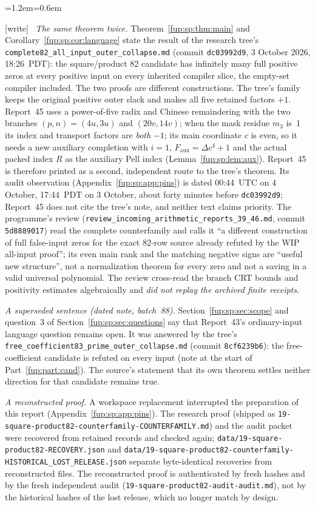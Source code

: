\documentclass[11pt,letterpaper]{article}
\theoremstyle{definition}\newtheorem{definition}[theorem]{Definition}
\theoremstyle{remark}\newtheorem{remark}[theorem]{Remark}
\newcommand{\Fa}{F_{\mathrm{aux}}}\newcommand{\Ua}{U_{\mathrm{aux}}}\newcommand{\ttt}{t_{\mathrm{tr}}}
\newcommand{\wtag}{\textup{[write]}}
\newenvironment{writenote}{\par\smallskip\begin{list}{}{\leftmargin=1.2em\rightmargin=0.6em}\item[]\small\wtag\ }{\end{list}\smallskip}
\newcommand{\rw}[1]{\nolinkurl{#1}}%
\begin{document}
\begin{writenote}
\emph{The same theorem twice.} Theorem~\ref{fup:sp:thm:main} and Corollary~\ref{fup:sp:cor:language} state the result of the research tree's \rw{complete82_all_input_outer_collapse.md} (commit \texttt{dc03992d9}, 3 October 2026, 18:26~PDT): the square/product 82 candidate has infinitely many full positive zeros at every positive input on every inherited compiler slice, the empty-set compiler included. The two proofs are different constructions. The tree's family keeps the original positive outer slack and makes all five retained factors $+1$. Report~45 uses a power-of-five radix and Chinese remaindering with the two branches $(p,n)=(4u,3u)$ and $(20v,14v)$; when the mask residue $m_3$ is~1 its index and transport factors are \emph{both} $-1$; its main coordinate $c$ is even, so it needs a new auxiliary completion with $i=1$, $\Fa=\Delta c^4+1$ and the actual packed index $R$ as the auxiliary Pell index (Lemma~\ref{fup:sp:lem:aux}). Report~45 is therefore printed as a second, independent route to the tree's theorem. Its audit observation (Appendix~\ref{fup:sp:app:pins}) is dated 00:44~UTC on 4 October, 17:44~PDT on 3 October, about forty minutes before \texttt{dc03992d9}; Report~45 does not cite the tree's note, and neither text claims priority. The programme's review (\rw{review_incoming_arithmetic_reports_39_46.md}, commit \texttt{5d8889017}) read the complete counterfamily and calls it ``a different construction of full false-input zeros for the exact 82-row source already refuted by the WIP all-input proof''; its even main rank and the matching negative signs are ``useful new structure'', not a normalization theorem for every zero and not a saving in a valid universal polynomial. The review cross-read the branch CRT bounds and positivity estimates algebraically and \emph{did not replay the archived finite receipts}.

\emph{A superseded sentence (dated note, batch~88).} Section~\ref{fup:sp:sec:scope} and question~3 of Section~\ref{fup:sp:sec:questions} say that Report~43's ordinary-input language question remains open. It was answered by the tree's \rw{free_coefficient83_prime_outer_collapse.md} (commit \texttt{8cf6239b6}): the free-coefficient candidate is refuted on every input (note at the start of Part~\ref{fup:part:cand}). The source's statement that its own theorem settles neither direction for that candidate remains true.

\emph{A reconstructed proof.} A workspace replacement interrupted the preparation of this report (Appendix~\ref{fup:sp:app:pins}). The research proof (shipped as \rw{19-square-product82-counterfamily-COUNTERFAMILY.md}) and the audit packet were recovered from retained records and checked again; \rw{data/19-square-product82-RECOVERY.json} and \rw{data/19-square-product82-counterfamily-HISTORICAL_LOST_RELEASE.json} separate byte-identical recoveries from reconstructed files. The reconstructed proof is authenticated by fresh hashes and by the fresh independent audit (\rw{19-square-product82-audit-audit.md}), not by the historical hashes of the lost release, which no longer match by design.


\end{writenote}
\end{document}
